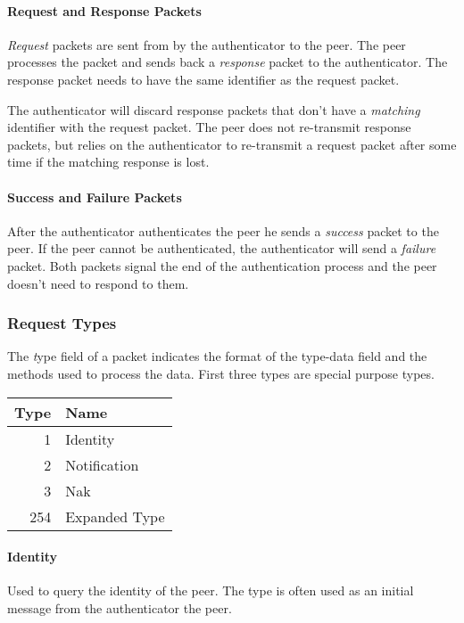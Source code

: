 \paragraph{Request and Response Packets} 
\textit{Request} packets are sent from by the authenticator to the peer. The peer processes the packet and sends back a \textit{response} packet to the authenticator. 
The response packet needs to have the same identifier as the request packet.

The authenticator will discard response packets that don't have a \textit{matching} identifier with the request packet.
The peer does not re-transmit response packets, but relies on the authenticator to re-transmit a request packet after some time if the matching response is lost.

\paragraph{Success and Failure Packets}

After the authenticator authenticates the peer he sends a \textit{success} packet to the peer. 
If the peer cannot be authenticated, the authenticator will send a \textit{failure} packet.
Both packets signal the end of the authentication process and the peer doesn't need to respond to them.


\subsubsection{Request Types}
The \textit type field of a packet indicates the format of the type-data field and the methods used to process the data. 
First three types are special purpose types.
\bigskip
\newline
\begin{tabular}{rl}
	Type & Name\\
	\hline
	1 & Identity\\
	2 & Notification\\
	3 & Nak\\
	254 & Expanded Type\\
\end{tabular}
\bigskip
\newline

\paragraph{Identity} Used to query the identity of the peer. The type is often used as an initial message from the authenticator the peer.

